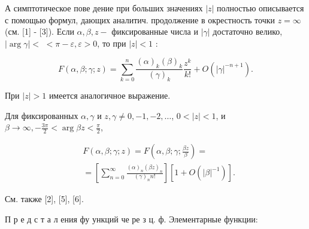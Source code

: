 \documentclass[10pt]{article}
\begin{document}
А симптотическое пове дение при больших значениях $|z|$ полностью описывается с помощью формул, дающих аналитич. продолжение в окрестность точки $z=\infty$ (см. [1] - [3]). Если $\alpha, \beta, z-$ фиксированные числа и $|\gamma|$ достаточно велико, $|\arg \gamma|<$ $<\pi-\varepsilon, \varepsilon>0$, то при $|z|<1$ :



\[

F(\alpha, \beta ; \gamma ; z)=\sum_{k=0}^{n} \frac{(\alpha)_{k}(\beta)_{k}}{(\gamma)_{k}} \frac{z^{k}}{k !}+O\left(|\gamma|^{-n+1}\right) .

\]



При $|z|>1$ имеется аналогичное выражение.



Для фиксированных $\alpha, \gamma$ и $z, \gamma \neq 0,-1,-2, \ldots$, $0<|z|<1$, и $\beta \rightarrow \infty,-\frac{3 \pi}{2}<\arg \beta z<\frac{\pi}{2}$,



\[

\begin{aligned}

& F(\alpha, \beta ; \gamma ; z)=F\left(\alpha, \beta ; \gamma ; \frac{\beta z}{\beta}\right)= \\

& =\left[\sum_{n=0}^{\infty} \frac{(\alpha)_{n}(\beta z)_{n}}{(\gamma)_{n} n !}\right]\left[1+O\left(|\beta|^{-1}\right)\right] .

\end{aligned}

\]



См. также [2], [5], [6].



П р е д с т а л ения фу ункций че ре $з$ ц. ф. Элементарные функции:
\end{document}
